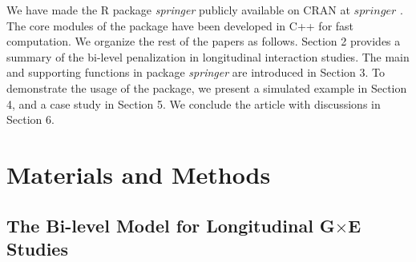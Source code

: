 \documentclass[12pt]{article}
\begin{document}
We have made the R package \emph{springer} publicly available on CRAN at  \href{https://CRAN.R-project.org/package=springer}{$springer$}     
 \cite{SP}. The core modules of the package have been developed in C++ for fast computation. We organize the rest of the papers as follows. Section 2 provides a summary of the bi-level penalization in longitudinal interaction studies. The main and supporting functions in package \emph{springer} are introduced in Section 3. {\color{blue}  To demonstrate the usage of the package, we present a simulated example in Section 4, and a case study in Section 5. We conclude the article with discussions in Section 6.}   
 
 
 

\section{Materials and Methods}
\subsection{ The Bi-level Model for Longitudinal G$\times$E Studies}\label{sec:3.1}
\end{document}
